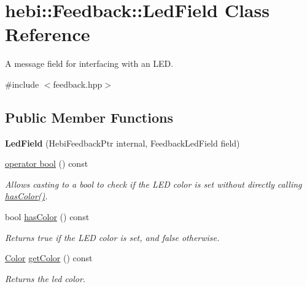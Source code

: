\hypertarget{classhebi_1_1Feedback_1_1LedField}{}\section{hebi\+:\+:Feedback\+:\+:Led\+Field Class Reference}
\label{classhebi_1_1Feedback_1_1LedField}


A message field for interfacing with an L\+ED.  




{\ttfamily \#include $<$feedback.\+hpp$>$}

\subsection*{Public Member Functions}
\begin{DoxyCompactItemize}
\item 
{\bfseries Led\+Field} (Hebi\+Feedback\+Ptr internal, Feedback\+Led\+Field field)\hypertarget{classhebi_1_1Feedback_1_1LedField_a3bb6871c57c7eb4b00d15ad001ec1fb0}{}\label{classhebi_1_1Feedback_1_1LedField_a3bb6871c57c7eb4b00d15ad001ec1fb0}

\item 
\hyperlink{classhebi_1_1Feedback_1_1LedField_a725454852c3c9f1e71022f7e51ecf6e6}{operator bool} () const 
\begin{DoxyCompactList}\small\item\em Allows casting to a bool to check if the L\+ED color is set without directly calling {\ttfamily \hyperlink{classhebi_1_1Feedback_1_1LedField_a9fb5bd115347991e476e89c7da783f78}{has\+Color()}}. \end{DoxyCompactList}\item 
bool \hyperlink{classhebi_1_1Feedback_1_1LedField_a9fb5bd115347991e476e89c7da783f78}{has\+Color} () const \hypertarget{classhebi_1_1Feedback_1_1LedField_a9fb5bd115347991e476e89c7da783f78}{}\label{classhebi_1_1Feedback_1_1LedField_a9fb5bd115347991e476e89c7da783f78}

\begin{DoxyCompactList}\small\item\em Returns true if the L\+ED color is set, and false otherwise. \end{DoxyCompactList}\item 
\hyperlink{structhebi_1_1Color}{Color} \hyperlink{classhebi_1_1Feedback_1_1LedField_a0040ce588480d51787ddce6f51c15326}{get\+Color} () const \hypertarget{classhebi_1_1Feedback_1_1LedField_a0040ce588480d51787ddce6f51c15326}{}\label{classhebi_1_1Feedback_1_1LedField_a0040ce588480d51787ddce6f51c15326}

\begin{DoxyCompactList}\small\item\em Returns the led color. \end{DoxyCompactList}\end{DoxyCompactItemize}


